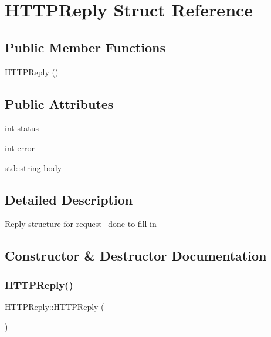 \hypertarget{struct_h_t_t_p_reply}{}\section{H\+T\+T\+P\+Reply Struct Reference}
\label{struct_h_t_t_p_reply}
\subsection*{Public Member Functions}
\begin{DoxyCompactItemize}
\item 
\mbox{\hyperlink{struct_h_t_t_p_reply_acb0b1c18264376e87701488236dce91d}{H\+T\+T\+P\+Reply}} ()
\end{DoxyCompactItemize}
\subsection*{Public Attributes}
\begin{DoxyCompactItemize}
\item 
int \mbox{\hyperlink{struct_h_t_t_p_reply_a2aabf3d54afbcf87fa91542fd9024838}{status}}
\item 
int \mbox{\hyperlink{struct_h_t_t_p_reply_af10328deec9dd5b65a5c9953159448ce}{error}}
\item 
std\+::string \mbox{\hyperlink{struct_h_t_t_p_reply_a5ee749be5b0bfcbf30b3983d67426c72}{body}}
\end{DoxyCompactItemize}


\subsection{Detailed Description}
Reply structure for request\+\_\+done to fill in 

\subsection{Constructor \& Destructor Documentation}
\mbox{\label{struct_h_t_t_p_reply_acb0b1c18264376e87701488236dce91d}} 
\subsubsection{\texorpdfstring{H\+T\+T\+P\+Reply()}{HTTPReply()}}
{\footnotesize\ttfamily H\+T\+T\+P\+Reply\+::\+H\+T\+T\+P\+Reply (\begin{DoxyParamCaption}{ }\end{DoxyParamCaption})\hspace{0.3cm}{\ttfamily [inline]}}



